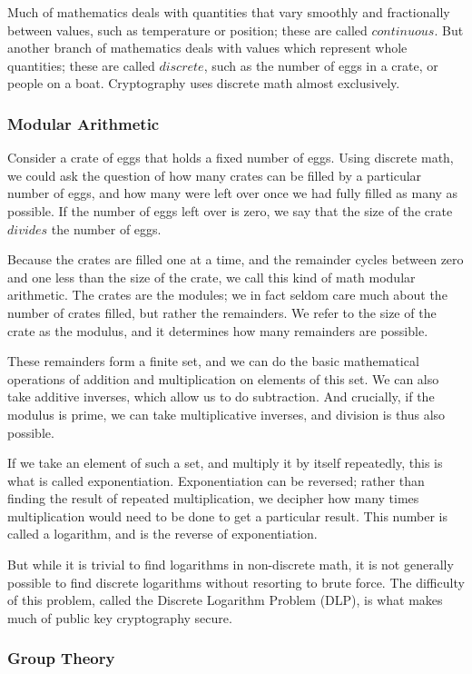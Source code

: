 \documentclass{article}
\begin{document}
Much of mathematics deals with quantities that vary smoothly and fractionally between values, such as temperature or position; these are called $continuous$.  But another branch of mathematics deals with values which represent whole quantities; these are called $discrete$, such as the number of eggs in a crate, or people on a boat.  Cryptography uses discrete math almost exclusively.

\subsubsection{Modular Arithmetic}

Consider a crate of eggs that holds a fixed number of eggs.  Using discrete math, we could ask the question of how many crates can be filled by a particular number of eggs, and how many were left over once we had fully filled as many as possible.  If the number of eggs left over is zero, we say that the size of the crate $divides$ the number of eggs.

Because the crates are filled one at a time, and the remainder cycles between zero and one less than the size of the crate, we call this kind of math modular arithmetic.  The crates are the modules; we in fact seldom care much about the number of crates filled, but rather the remainders.  We refer to the size of the crate as the modulus, and it determines how many remainders are possible.

These remainders form a finite set, and we can do the basic mathematical operations of addition and multiplication on elements of this set. We can also take additive inverses, which allow us to do subtraction.  And crucially, if the modulus is prime, we can take multiplicative inverses, and division is thus also possible.

If we take an element of such a set, and multiply it by itself repeatedly, this is what is called exponentiation.  Exponentiation can be reversed; rather than finding the result of repeated multiplication, we decipher how many times multiplication would need to be done to get a particular result.  This number is called a logarithm, and is the reverse of exponentiation.

But while it is trivial to find logarithms in non-discrete math, it is not generally possible to find discrete logarithms without resorting to brute force.  The difficulty of this problem, called the Discrete Logarithm Problem (DLP), is what makes much of public key cryptography secure.

\subsubsection{Group Theory}
\end{document}
